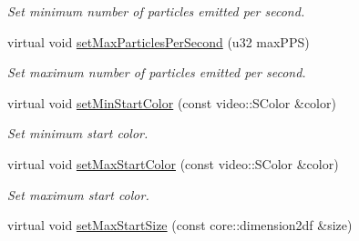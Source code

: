 \begin{DoxyCompactItemize}
\begin{DoxyCompactList}\small\item\em Set minimum number of particles emitted per second. \end{DoxyCompactList}\item 
\hypertarget{classirr_1_1scene_1_1_c_particle_point_emitter_a5e300886c1300d87f50e4fb1ab5eb802}{virtual void \hyperlink{classirr_1_1scene_1_1_c_particle_point_emitter_a5e300886c1300d87f50e4fb1ab5eb802}{set\-Max\-Particles\-Per\-Second} (u32 max\-P\-P\-S)}\label{classirr_1_1scene_1_1_c_particle_point_emitter_a5e300886c1300d87f50e4fb1ab5eb802}

\begin{DoxyCompactList}\small\item\em Set maximum number of particles emitted per second. \end{DoxyCompactList}\item 
\hypertarget{classirr_1_1scene_1_1_c_particle_point_emitter_ad8546f5992d8d37aa9cf159ecae88bc6}{virtual void \hyperlink{classirr_1_1scene_1_1_c_particle_point_emitter_ad8546f5992d8d37aa9cf159ecae88bc6}{set\-Min\-Start\-Color} (const video\-::\-S\-Color \&color)}\label{classirr_1_1scene_1_1_c_particle_point_emitter_ad8546f5992d8d37aa9cf159ecae88bc6}

\begin{DoxyCompactList}\small\item\em Set minimum start color. \end{DoxyCompactList}\item 
\hypertarget{classirr_1_1scene_1_1_c_particle_point_emitter_aeab17d1731ec387d9f9c8ca99c575a45}{virtual void \hyperlink{classirr_1_1scene_1_1_c_particle_point_emitter_aeab17d1731ec387d9f9c8ca99c575a45}{set\-Max\-Start\-Color} (const video\-::\-S\-Color \&color)}\label{classirr_1_1scene_1_1_c_particle_point_emitter_aeab17d1731ec387d9f9c8ca99c575a45}

\begin{DoxyCompactList}\small\item\em Set maximum start color. \end{DoxyCompactList}\item 
\hypertarget{classirr_1_1scene_1_1_c_particle_point_emitter_abc5b349c9340d33a3fbfa47e28240f99}{virtual void \hyperlink{classirr_1_1scene_1_1_c_particle_point_emitter_abc5b349c9340d33a3fbfa47e28240f99}{set\-Max\-Start\-Size} (const core\-::dimension2df \&size)}\label{classirr_1_1scene_1_1_c_particle_point_emitter_abc5b349c9340d33a3fbfa47e28240f99}


\end{DoxyCompactItemize}
